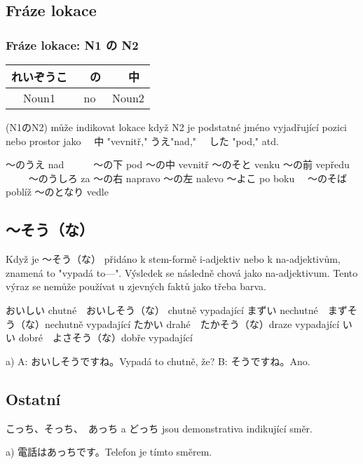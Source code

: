 \subsection{Fráze lokace}
\subsubsection{Fráze lokace: N1 の N2}
\begin{center}
\begin{tabular}{|c|c|c|}
\hline
れいぞうこ&　の&　中\\
\hline
Noun1 & no& Noun2\\
\hline
\end{tabular}
\end{center}

(N1のN2) může indikovat lokace když N2 je podstatné jméno vyjadřující pozici nebo prostor jako 　中 "vevnitř," うえ"nad," 　した "pod," atd.

〜のうえ nad　　　〜の下 pod
〜の中 vevnitř		〜のそと venku
〜の前 vepředu 　　	〜のうしろ za
〜の右 napravo		〜の左 nalevo
〜よこ po boku　		〜のそば poblíž
〜のとなり vedle

\subsection{〜そう（な）}

Když je 〜そう（な） přidáno k stem-formě i-adjektiv nebo k na-adjektivům, znamená to "vypadá to---". Výsledek se následně chová jako na-adjektivum. Tento výraz se nemůže používat u zjevných faktů jako třeba barva. 

おいしい chutné　おいしそう（な） chutně vypadající
まずい nechutné　まずそう（な）nechutně vypadající
たかい drahé　たかそう（な）draze vypadající
いい dobré　よさそう（な）dobře vypadající

a)
A: おいしそうですね。Vypadá to chutně, že?
B: そうですね。Ano.

\subsection{Ostatní}
こっち、そっち、　あっち a どっち jsou demonstrativa indikující směr.

a) 電話はあっちです。Telefon je tímto směrem.



